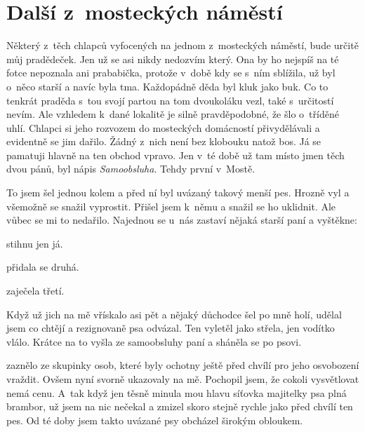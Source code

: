 
\chapter{Další z~mosteckých náměstí}

Některý z~těch chlapců vyfocených na jednom z~mosteckých náměstí, bude určitě
můj pradědeček. Jen už se asi nikdy nedozvím který. Ona by ho nejspíš na té
fotce nepoznala ani prababička, protože v~době kdy se s~ním sblížila, už byl
o~něco starší a navíc byla tma. Každopádně děda byl kluk jako buk. Co to
tenkrát praděda s~tou svojí partou na tom dvoukoláku vezl, také s~určitostí
nevím. Ale vzhledem k~dané lokalitě je silně pravděpodobné, že šlo o~tříděné
uhlí. Chlapci si jeho rozvozem do mosteckých domácností přivydělávali a
evidentně se jim dařilo. Žádný z~nich není bez klobouku natož bos. Já se
pamatuji hlavně na ten obchod vpravo. Jen v~té době už tam místo jmen těch dvou
pánů, byl nápis {\em Samoobsluha}. Tehdy první v~Mostě.

To jsem šel jednou kolem a před ní byl uvázaný takový menší pes. Hrozně vyl a
všemožně se snažil vyprostit. Přišel jsem k~němu a snažil se ho uklidnit. Ale
vůbec se mi to nedařilo. Najednou se u~nás zastaví nějaká starší paní a
vyštěkne: 

 stihnu jen já.

 přidala se
druhá.

 zaječela
třetí.

Když už jich na mě vřískalo asi pět a nějaký důchodce šel po mně holí, udělal
jsem co chtějí a rezignovaně psa odvázal. Ten vyletěl jako střela, jen vodítko
vlálo. Krátce na to vyšla ze samoobsluhy paní a sháněla se po psovi.

 zaznělo ze
skupinky osob, které byly ochotny ještě před chvílí pro jeho osvobození
vraždit. Ovšem nyní svorně ukazovaly na mě. Pochopil jsem, že cokoli
vysvětlovat nemá cenu. A~tak když jen těsně minula mou hlavu síťovka majitelky
psa plná brambor, už jsem na nic nečekal a zmizel skoro stejně rychle jako před
chvílí ten pes. Od té doby jsem takto uvázané psy obcházel širokým obloukem.

